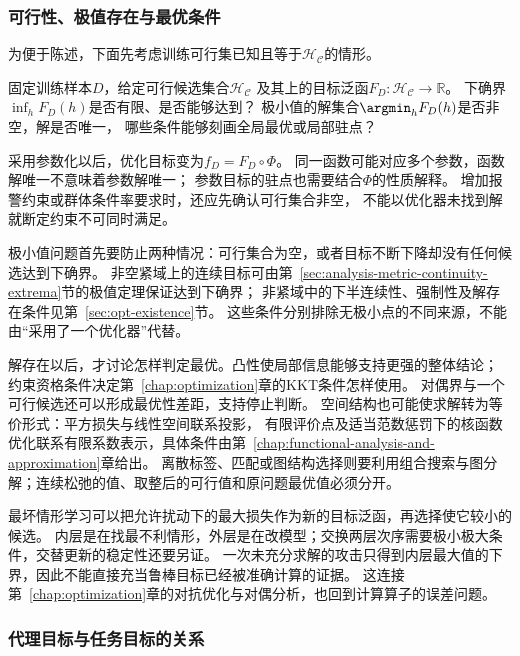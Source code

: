 \subsubsection{可行性、极值存在与最优条件}
\label{sec:future-analysis-minimizer}

为便于陈述，下面先考虑训练可行集已知且等于$\mathcal H_{\mathcal C}$的情形。

\begin{mathproblem}[目标泛函的极小值与解]
  \label{question:future-minimizer}
  固定训练样本$D$，给定可行候选集合$\mathcal H_{\mathcal C}$
  及其上的目标泛函$F_D:\mathcal H_{\mathcal C}\to\mathbb R$。
  下确界$\inf_hF_D(h)$是否有限、是否能够达到？
  极小值的解集合$\argmin_hF_D(h)$是否非空，解是否唯一，
  哪些条件能够刻画全局最优或局部驻点？
\end{mathproblem}

采用参数化以后，优化目标变为$f_D=F_D\circ\Phi$。
同一函数可能对应多个参数，函数解唯一不意味着参数解唯一；
参数目标的驻点也需要结合$\Phi$的性质解释。
增加报警约束或群体条件率要求时，还应先确认可行集合非空，
不能以优化器未找到解就断定约束不可同时满足。

极小值问题首先要防止两种情况：可行集合为空，或者目标不断下降却没有任何候选达到下确界。
非空紧域上的连续目标可由第~\ref{sec:analysis-metric-continuity-extrema}节的极值定理保证达到下确界；
非紧域中的下半连续性、强制性及解存在条件见第~\ref{sec:opt-existence}节。
这些条件分别排除无极小点的不同来源，不能由“采用了一个优化器”代替。

解存在以后，才讨论怎样判定最优。凸性使局部信息能够支持更强的整体结论；
约束资格条件决定第~\ref{chap:optimization}章的KKT条件怎样使用。
对偶界与一个可行候选还可以形成最优性差距，支持停止判断。
空间结构也可能使求解转为等价形式：平方损失与线性空间联系投影，
有限评价点及适当范数惩罚下的核函数优化联系有限系数表示，具体条件由第~\ref{chap:functional-analysis-and-approximation}章给出。
离散标签、匹配或图结构选择则要利用组合搜索与图分解；连续松弛的值、取整后的可行值和原问题最优值必须分开。

最坏情形学习可以把允许扰动下的最大损失作为新的目标泛函，再选择使它较小的候选。
内层是在找最不利情形，外层是在改模型；交换两层次序需要极小极大条件，交替更新的稳定性还要另证。
一次未充分求解的攻击只得到内层最大值的下界，因此不能直接充当鲁棒目标已经被准确计算的证据。
这连接第~\ref{chap:optimization}章的对抗优化与对偶分析，也回到计算算子的误差问题。

\subsubsection{代理目标与任务目标的关系}
\label{sec:future-analysis-proxy-risk}

